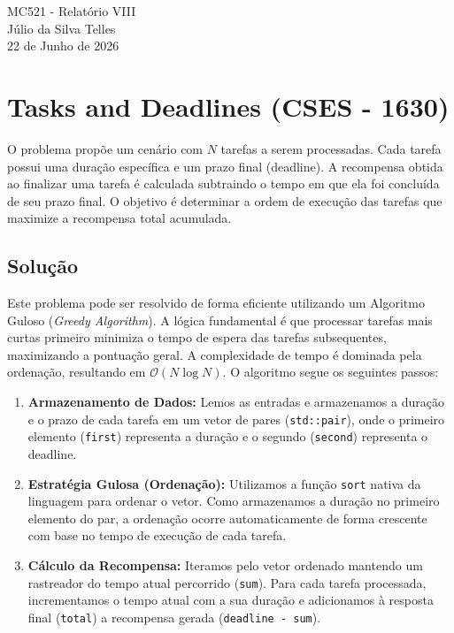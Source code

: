 \documentclass[12pt,a4paper]{article}
\begin{document}
\begin{center}
    {\LARGE MC521 - Relatório VIII} \\ [2,5em]
    {\large Júlio da Silva Telles} \\ [1,0em]
    {\large 22 de Junho de 2026} \\ [1,5em]
\end{center}

\vspace{1cm} 

\section{Tasks and Deadlines (CSES - 1630)}
O problema propõe um cenário com $N$ tarefas a serem processadas. Cada tarefa possui uma duração específica e um prazo final (deadline). A recompensa obtida ao finalizar uma tarefa é calculada subtraindo o tempo em que ela foi concluída de seu prazo final. O objetivo é determinar a ordem de execução das tarefas que maximize a recompensa total acumulada.

\subsection{Solução}
Este problema pode ser resolvido de forma eficiente utilizando um Algoritmo Guloso (\textit{Greedy Algorithm}). A lógica fundamental é que processar tarefas mais curtas primeiro minimiza o tempo de espera das tarefas subsequentes, maximizando a pontuação geral. A complexidade de tempo é dominada pela ordenação, resultando em $\mathcal{O}(N \log N)$. O algoritmo segue os seguintes passos:

\begin{enumerate}
    \item \textbf{Armazenamento de Dados:} Lemos as entradas e armazenamos a duração e o prazo de cada tarefa em um vetor de pares (\texttt{std::pair}), onde o primeiro elemento (\texttt{first}) representa a duração e o segundo (\texttt{second}) representa o deadline.
    \item \textbf{Estratégia Gulosa (Ordenação):} Utilizamos a função \texttt{sort} nativa da linguagem para ordenar o vetor. Como armazenamos a duração no primeiro elemento do par, a ordenação ocorre automaticamente de forma crescente com base no tempo de execução de cada tarefa.
    \item \textbf{Cálculo da Recompensa:} Iteramos pelo vetor ordenado mantendo um rastreador do tempo atual percorrido (\texttt{sum}). Para cada tarefa processada, incrementamos o tempo atual com a sua duração e adicionamos à resposta final (\texttt{total}) a recompensa gerada (\texttt{deadline - sum}).
\end{enumerate}
\end{document}
